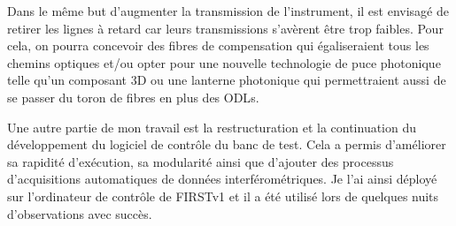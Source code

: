 Dans le même but d'augmenter la transmission de l'instrument, il est envisagé de retirer les lignes à retard car leurs transmissions s'avèrent être trop faibles. Pour cela, on pourra concevoir des fibres de compensation qui égaliseraient tous les chemins optiques et/ou opter pour une nouvelle technologie de puce photonique telle qu'un composant 3D ou une lanterne photonique qui permettraient aussi de se passer du toron de fibres en plus des \ac{ODL}s.

Une autre partie de mon travail est la restructuration et la continuation du développement du logiciel de contrôle du banc de test. Cela a permis d'améliorer sa rapidité d'exécution, sa modularité ainsi que d'ajouter des processus d'acquisitions automatiques de données interférométriques. Je l'ai ainsi déployé sur l'ordinateur de contrôle de \ac{FIRSTv1} et il a été utilisé lors de quelques nuits d'observations avec succès.
